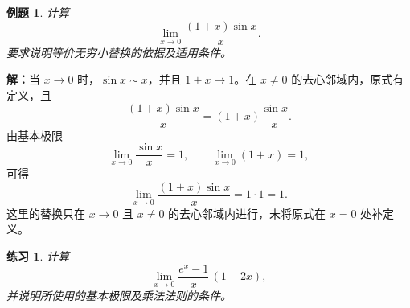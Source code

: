 \documentclass[UTF8,fontset=fandol,11pt]{ctexart}
\newtheorem{example}[definition]{例题}
\newtheorem{exercise}[definition]{练习}
\begin{document}
\begin{example}
计算
\[
\lim_{x\to0}\frac{(1+x)\sin x}{x}.
\]
要求说明等价无穷小替换的依据及适用条件。
\end{example}
\par\noindent\textbf{解：}当 $x\to0$ 时，$\sin x\sim x$，并且 $1+x\to1$。在 $x\neq0$ 的去心邻域内，原式有定义，且
\[
\frac{(1+x)\sin x}{x}=(1+x)\frac{\sin x}{x}.
\]
由基本极限
\[
\lim_{x\to0}\frac{\sin x}{x}=1,
\qquad
\lim_{x\to0}(1+x)=1,
\]
可得
\[
\lim_{x\to0}\frac{(1+x)\sin x}{x}=1\cdot1=1.
\]
这里的替换只在 $x\to0$ 且 $x\neq0$ 的去心邻域内进行，未将原式在 $x=0$ 处补定义。\par
\begin{exercise}
\label{mathagent:exercise:410f498083ff9a28d1a2acf9839e74554b434d3445561642fdfe5d3854f06971}
计算
\[
\lim_{x\to0}\frac{e^x-1}{x}\,(1-2x),
\]
并说明所使用的基本极限及乘法法则的条件。
\end{exercise}
\end{document}
